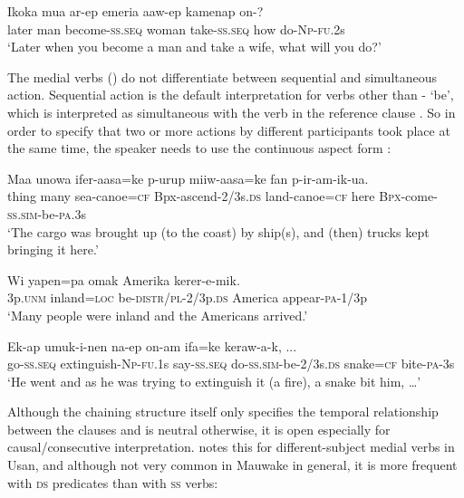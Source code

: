 \ea%
\label{ex:8:x1445}
\gll Ikoka  mua  ar-ep  emeria  aaw-ep  kamenap  on-? \\
later  man  become-\textsc{ss}.\textsc{seq} woman take-\textsc{ss}.\textsc{seq} how do-\textsc{Np}-\textsc{fu}.2s\\
\glt`Later when you become a man and take a wife, what will you do?'
\z


The  medial verbs () do not differentiate between sequential and simultaneous action. Sequential action  is the default interpretation for verbs other than - `be', which is interpreted as simultaneous with the verb in the reference clause . So in order to specify that two or more actions by different participants took place at the same time, the speaker needs to use the continuous aspect form :

\ea%
\label{ex:8:x1502}
\gll Maa  unowa  ifer-aasa=ke  p-urup miiw-aasa=ke fan  p-ir-am-ik-ua.\\
thing  many  sea-canoe=\textsc{cf} Bpx-ascend-2/3s.\textsc{ds} land-canoe=\textsc{cf} here \textsc{Bpx}-come-\textsc{ss}.\textsc{sim}-be-\textsc{pa}.3s\\
\glt`The cargo was brought up (to the coast) by ship(s), and (then) trucks kept bringing it here.'
\z


\ea%
\label{ex:8:x1503}
\gll Wi  yapen=pa  omak  Amerika  kerer-e-mik.\\
3p.\textsc{unm} inland=\textsc{loc} be-\textsc{distr}/\textsc{pl}-2/3p.\textsc{ds} America appear-\textsc{pa}-1/3p\\
\glt`Many people were inland and the Americans arrived.'
\z


\ea%
\label{ex:8:x1472}
\gll Ek-ap  umuk-i-nen  na-ep  on-am ifa=ke  keraw-a-k,  ...\\
go-\textsc{ss}.\textsc{seq} extinguish-\textsc{Np}-\textsc{fu}.1s  say-\textsc{ss}.\textsc{seq} do-\textsc{ss}.\textsc{sim}-be-2/3s.\textsc{ds} snake=\textsc{cf} bite-\textsc{pa}-3s\\
\glt`He went and as he was trying to extinguish it (a fire), a snake bit him, {\dots}'
\z


Although the chaining structure itself only specifies the temporal relationship between the clauses and is neutral otherwise, it is open especially for causal/consecutive interpretation. \citet[237]{Reesink1983} notes this for different-subject medial verbs in Usan, and although not very common in Mauwake in general, it is more frequent with \textsc{ds} predicates than with \textsc{ss} verbs:

